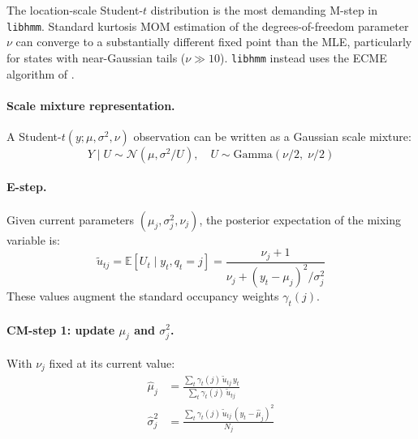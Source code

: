 \documentclass[11pt]{article}
\begin{document}
The location-scale Student-$t$ distribution is the most demanding
M-step in \texttt{libhmm}.
Standard kurtosis MOM estimation of the degrees-of-freedom parameter $\nu$
can converge to a substantially different fixed point than the MLE,
particularly for states with near-Gaussian tails ($\nu \gg 10$).
\texttt{libhmm} instead uses the ECME algorithm of \citet{Liu1994}.

\paragraph{Scale mixture representation.}
A Student-$t(y; \mu, \sigma^2, \nu)$ observation can be written as a
Gaussian scale mixture:
\begin{equation}
  Y \mid U \sim \mathcal{N}(\mu, \sigma^2/U), \quad
  U \sim \text{Gamma}(\nu/2,\; \nu/2)
\end{equation}

\paragraph{E-step.}
Given current parameters $(\mu_j, \sigma_j^2, \nu_j)$, the posterior
expectation of the mixing variable is:
\begin{equation}
  \tilde{u}_{tj} = \mathbb{E}[U_t \mid y_t, q_t = j]
    = \frac{\nu_j + 1}{\nu_j + (y_t - \mu_j)^2 / \sigma_j^2}
  \label{eq:utilde}
\end{equation}
These values augment the standard occupancy weights $\gamma_t(j)$.

\paragraph{CM-step 1: update $\mu_j$ and $\sigma_j^2$.}
With $\nu_j$ fixed at its current value:
\begin{align}
  \hat{\mu}_j &= \frac{\sum_t \gamma_t(j)\, \tilde{u}_{tj}\, y_t}
                      {\sum_t \gamma_t(j)\, \tilde{u}_{tj}} \label{eq:mu} \\
  \hat{\sigma}_j^2 &= \frac{\sum_t \gamma_t(j)\, \tilde{u}_{tj}\, (y_t - \hat{\mu}_j)^2}
                            {N_j} \label{eq:sigma}
\end{align}
\end{document}
